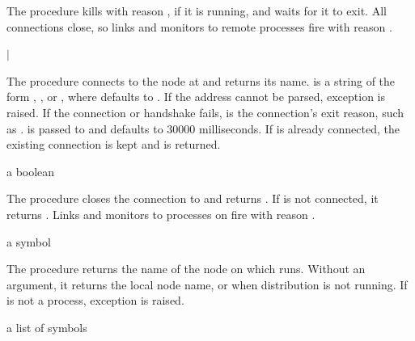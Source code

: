 The  procedure kills  with reason
, if it is running, and waits for it to exit. All
connections close, so links and monitors to remote processes fire with
reason .

\begin{procedure}
\end{procedure}
\returns{}
 $|$

The  procedure connects to the node at 
and returns its name.  is a string of the form
, ,
or , where
 defaults to . If the address cannot be parsed,
exception  is raised. If the
connection or handshake fails,  is the connection's exit
reason, such as .  is passed to
 and defaults to 30000 milliseconds. If 
is already connected, the existing connection is kept and
 is returned.

\begin{procedure}
\end{procedure}
\returns{} a boolean

The  procedure closes the connection to
 and returns . If  is not connected, it
returns . Links and monitors to processes on  fire
with reason .

\begin{procedure}
\end{procedure}
\returns{} a symbol

The  procedure returns the name of the node on which
 runs. Without an argument, it returns the local node
name, or  when distribution is not running. If
 is not a process, exception  is raised.

\begin{procedure}
\end{procedure}
\returns{} a list of symbols

